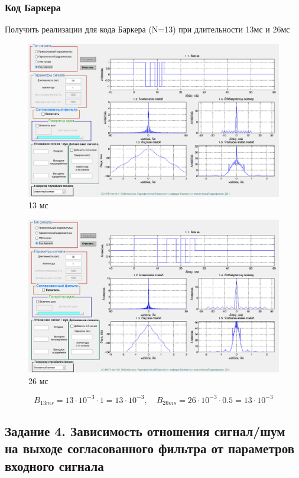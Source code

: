 \subsubsection{Код Баркера}
Получить реализации для кода Баркера (N=13) при длительности 13мс и
26мс
\begin{figure}[H]
    \centering
    \includegraphics[width=0.9\linewidth]{imgs/t1s4_13.png}
    \caption{13 мс}
    \label{fig:task4_13}
\end{figure}
\begin{figure}[H]
    \centering
    \includegraphics[width=0.9\linewidth]{imgs/t1s4_26.png}
    \caption{26 мс}
    \label{fig:task4_26}
\end{figure}

\begin{equation}
    B_{13ms} = 13 \cdot 10^{-3} \cdot 1 = 13 \cdot 10^{-3}, \quad B_{26ms} = 26 \cdot 10^{-3} \cdot 0.5 = 13 \cdot 10^{-3}
    \label{eq:}
\end{equation}




\subsection{Задание 4. Зависимость отношения сигнал/шум на выходе согласованного
фильтра от параметров входного сигнала}

